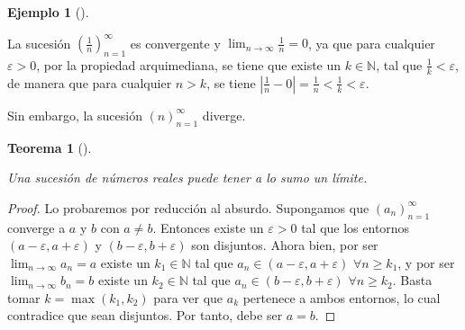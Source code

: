 \documentclass[
  a4paper,
]{scrreport}
\theoremstyle{definition}
\newtheorem{example}{Ejemplo}[chapter]
\theoremstyle{plain}
\theoremstyle{definition}
\theoremstyle{definition}
\theoremstyle{plain}
\newtheorem{theorem}{Teorema}[chapter]
\theoremstyle{plain}
\theoremstyle{remark}
\begin{document}
\begin{example}[]\protect\hypertarget{exm-limite-sucesion}{}\label{exm-limite-sucesion}

La sucesión \((\frac{1}{n})_{n=1}^\infty\) es convergente y
\(\lim_{n\to\infty}\frac{1}{n} = 0\), ya que para cualquier
\(\varepsilon>0\), por la propiedad arquimediana, se tiene que existe un
\(k\in\mathbb{N}\), tal que \(\frac{1}{k}<\varepsilon\), de manera que
para cualquier \(n>k\), se tiene
\(|\frac{1}{n}-0| = \frac{1}{n} <\frac{1}{k}<\varepsilon\).

Sin embargo, la sucesión \((n)_{n=1}^\infty\) diverge.

\end{example}

\begin{theorem}[]\protect\hypertarget{thm-unicidad-limite-sucesion}{}\label{thm-unicidad-limite-sucesion}

Una sucesión de números reales puede tener a lo sumo un límite.

\end{theorem}

\begin{tcolorbox}[enhanced jigsaw, leftrule=.75mm, colbacktitle=quarto-callout-note-color!10!white, toprule=.15mm, opacityback=0, opacitybacktitle=0.6, toptitle=1mm, breakable, bottomtitle=1mm, colframe=quarto-callout-note-color-frame, rightrule=.15mm, titlerule=0mm, title=\textcolor{quarto-callout-note-color}{\faInfo}\hspace{0.5em}{Demostración}, arc=.35mm, left=2mm, bottomrule=.15mm, colback=white, coltitle=black]

\begin{proof}
Lo probaremos por reducción al absurdo. Supongamos que
\((a_n)_{n=1}^\infty\) converge a \(a\) y \(b\) con \(a\neq b\).
Entonces existe un \(\varepsilon>0\) tal que los entornos
\((a-\varepsilon,a+\varepsilon)\) y \((b-\varepsilon,b+\varepsilon)\)
son disjuntos. Ahora bien, por ser \(\lim_{n\to\infty}a_n = a\) existe
un \(k_1\in\mathbb{N}\) tal que \(a_n\in(a-\varepsilon,a+\varepsilon)\)
\(\forall n\geq k_1\), y por ser \(\lim_{n\to\infty}b_n = b\) existe un
\(k_2\in\mathbb{N}\) tal que \(a_n\in(b-\varepsilon,b+\varepsilon)\)
\(\forall n\geq k_2\). Basta tomar \(k=\max(k_1,k_2)\) para ver que
\(a_k\) pertenece a ambos entornos, lo cual contradice que sean
disjuntos. Por tanto, debe ser \(a=b\).
\end{proof}

\end{tcolorbox}
\end{document}
